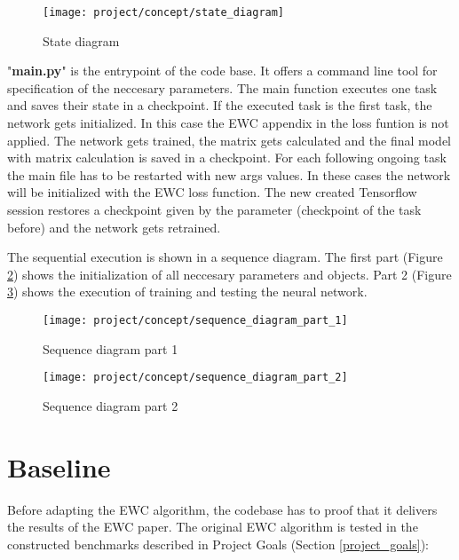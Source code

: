 \begin{figure}[H]
    \centering
    \texttt{[image: project/concept/state\_diagram]}
    \caption{State diagram}
    \label{fig:concept_state_diagram}
\end{figure}

"\textbf{main.py}" is the entrypoint of the code base.
It offers a command line tool for specification of the neccesary parameters.
\newline
The main function executes one task and saves their state in a checkpoint.
If the executed task is the first task, the network gets initialized.
In this case the EWC appendix in the loss funtion is not applied.
The network gets trained, the matrix gets calculated and the final model with matrix calculation is saved in a checkpoint.
For each following ongoing task the main file has to be restarted with new args values.
In these cases the network will be initialized with the EWC loss function.
The new created Tensorflow session restores a checkpoint given by the parameter (checkpoint of the task before) and the network gets retrained.

The sequential execution is shown in a sequence diagram.
The first part (Figure \ref{fig:concept_sequence_diagram_part_1}) shows the initialization of all neccesary parameters and objects.
Part 2 (Figure \ref{fig:concept_sequence_diagram_part_2}) shows the execution of training and testing the neural network.

\begin{figure}[H]
    \centering
    \texttt{[image: project/concept/sequence\_diagram\_part\_1]}
    \caption{Sequence diagram part 1}
    \label{fig:concept_sequence_diagram_part_1}
\end{figure}

\begin{figure}[H]
    \centering
    \texttt{[image: project/concept/sequence\_diagram\_part\_2]}
    \caption{Sequence diagram part 2}
    \label{fig:concept_sequence_diagram_part_2}
\end{figure}

\newpage
\section{Baseline}

Before adapting the EWC algorithm, the codebase has to proof that it delivers the results of the EWC paper.
The original EWC algorithm is tested in the constructed benchmarks described in Project Goals (Section \ref{project_goals}):

